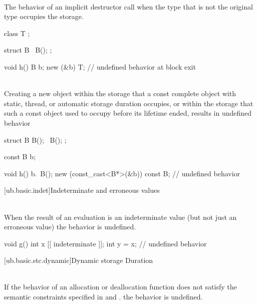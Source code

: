 \pnum
{} \\
The behavior of an implicit destructor call when the type that is not
the original type occupies the storage.

\pnum
\begin{example}
\begin{codeblock}
class T {};

struct B {
  ~B();
};

void h() {
  B b;
  new (&b) T;
}               // undefined behavior at block exit
\end{codeblock}
\end{example}


\pnum
{} \\
Creating a new object within the storage that a const complete object with static, thread, or automatic
storage duration occupies, or within the storage that such a const object used to occupy before its lifetime
ended, results in undefined behavior

\pnum
\begin{example}
\begin{codeblock}
struct B {
  B();
  ~B();
};

const B b;

void h() {
  b.~B();
  new (const_cast<B*>(&b)) const B; // undefined behavior
}
\end{codeblock}
\end{example}

[ub.basic.indet]{Indeterminate and erroneous values}

\pnum
{} \\
When the result of an evaluation is
an indeterminate value
(but not just an erroneous value)
the behavior is undefined.

\pnum
\begin{example}
\begin{codeblock}
void g() {
  int x [[ indeterminate ]];
  int y = x;    // undefined behavior
}
\end{codeblock}
\end{example}

[ub.basic.stc.dynamic]{Dynamic storage Duration}

\pnum
{} \\
If the behavior of an allocation or deallocation function does not satisfy the semantic constraints
specified
in  and .
the behavior is undefined.


